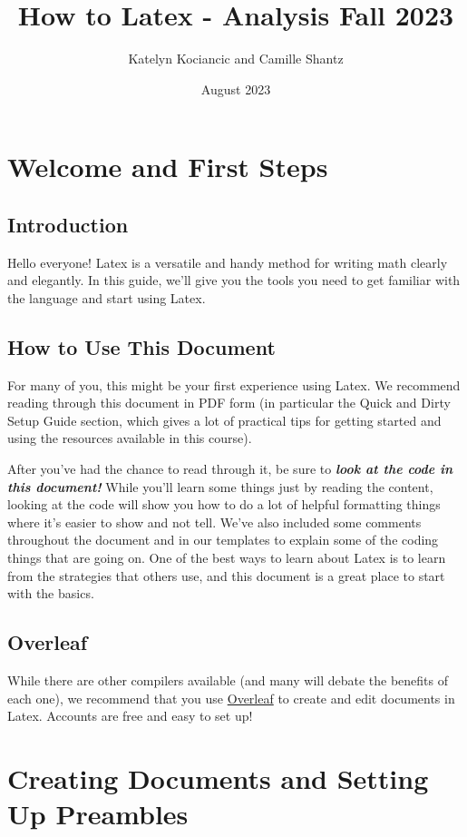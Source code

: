 \documentclass[11 pt]{article}
\title{How to Latex - Analysis Fall 2023}
\author{Katelyn Kociancic and Camille Shantz }
\date{August 2023}
\begin{document}
\maketitle

\section{Welcome and First Steps}

\subsection*{Introduction}

Hello everyone! Latex is a versatile and handy method for writing math clearly and elegantly. In this guide, we'll give you the tools you need to get familiar with the language and start using Latex.

\subsection*{How to Use This Document}

For many of you, this might be your first experience using Latex. We recommend reading through this document in PDF form (in particular the Quick and Dirty Setup Guide section, which gives a lot of practical tips for getting started and using the resources available in this course). 

After you've had the chance to read through it, be sure to \textit{\textbf{look at the code in this document!}} While you'll learn some things just by reading the content, looking at the code will show you how to do a lot of helpful formatting things where it's easier to show and not tell. We've also included some comments throughout the document and in our templates to explain some of the coding things that are going on. One of the best ways to learn about Latex is to learn from the strategies that others use, and this document is a great place to start with the basics.

\subsection*{Overleaf}
While there are other compilers available (and many will debate the benefits of each one), we recommend that you use \href{https://www.overleaf.com/project}{Overleaf} to create and edit documents in Latex. Accounts are free and easy to set up!
\section{Creating Documents and Setting Up Preambles}
\end{document}
